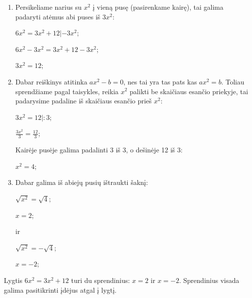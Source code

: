 \documentclass[a4paper]{article}
\begin{document}
\begin{enumerate}

    \item Persikeliame narius su $ x^2 $ į vieną pusę (pasirenkame kairę), tai galima padaryti atėmus abi puses iš $ 3x^{2} $:
    
    $ 6x^{2}=3x^{2}+12|-3x^{2} $;
    
    $ 6x^{2}-3x^{2}=3x^{2}+12-3x^{2} $;

    $ 3x^{2}=12 $;

    \item Dabar reiškinys atitinka $ ax^{2}-b=0 $, nes tai yra tas pats kas $ ax^{2}=b $. Toliau sprendžiame pagal taisykles, reikia $ x^2 $ palikti be skaičiaus esančio priekyje, tai padarysime padaline iš skaičiaus esančio prieš $ x^{2} $:
    
    $ 3x^{2}=12 |: 3 $;

    $ \frac{3x^{2}}{3}=\frac{12}{3}$;

    Kairėje pusėje galima padalinti 3 iš 3, o dešinėje 12 iš 3:

    $ x^{2}=4 $;

    \item Dabar galima iš abiejų pusių ištraukti šaknį: 
    
    $ \sqrt{x^{2}}=\sqrt{4}$;

    $ x=2$;

    ir 

    $ \sqrt{x^{2}}=-\sqrt{4}$;

    $ x=-2$;

\end{enumerate}

Lygtis $ 6x^{2}=3x^{2}+12 $ turi du sprendinius: $ x=2 $ ir $x=-2$. Sprendinius visada galima pasitikrinti įdėjus atgal į lygtį.



\end{document}
